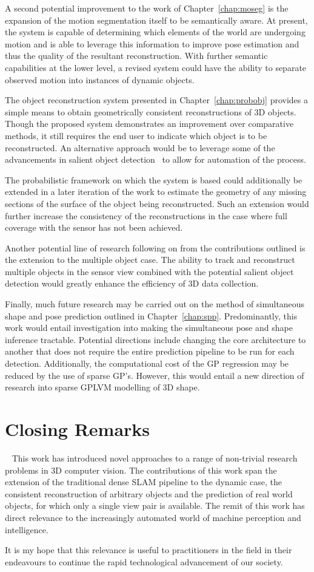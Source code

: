 A second potential improvement to the work of Chapter~\ref{chap:moseg} is the expansion of the 
motion segmentation itself to be semantically aware. At present, the system is capable of 
determining which elements of the world are undergoing motion and is able to leverage this 
information to improve pose estimation and thus the quality of the resultant reconstruction. 
With further semantic capabilities at the lower level, a revised system could have the ability 
to separate observed motion into instances of dynamic objects.

The object reconstruction system presented in Chapter~\ref{chap:probobj} provides a simple means 
to obtain geometrically consistent reconstructions of 3D objects. Though the proposed system
demonstrates an improvement over comparative methods, it still requires the end user to indicate 
which object is to be reconstructed. An alternative approach would be to leverage some of the 
advancements in salient object detection~\cite{Borji2014} to allow for automation of the process.

The probabilistic framework on which the system is based could additionally be extended in a later 
iteration of the work to estimate the geometry of any missing sections of the surface of the object 
being reconstructed. Such an extension would further increase the consistency of the reconstructions 
in the case where full coverage with the sensor has not been achieved.

Another potential line of research following on from the contributions outlined is the extension to 
the multiple object case. The ability to track and reconstruct multiple objects in the sensor view 
combined with the potential salient object detection would greatly enhance the efficiency of 3D data 
collection.

Finally, much future research may be carried out on the method of simultaneous shape and pose prediction 
outlined in Chapter~\ref{chap:spp}. Predominantly, this work would entail investigation into making the 
simultaneous pose and shape inference tractable. Potential directions include changing the core architecture 
to another that does not require the entire prediction pipeline to be run for each detection. Additionally, 
the computational cost of the GP regression may be reduced by the use of sparse GP's. However, this would 
entail a new direction of research into sparse GPLVM modelling of 3D shape.

\section{Closing Remarks}
~\label{sec:discussion_conclusions}
This work has introduced novel approaches to a range of non-trivial research problems in 3D computer 
vision. The contributions of this work span the extension of the traditional dense SLAM pipeline to 
the dynamic case, the consistent reconstruction of arbitrary objects and the prediction of real world 
objects, for which only a single view pair is available. The remit of this work has direct relevance to 
the increasingly automated world of machine perception and intelligence.

It is my hope that this relevance is useful to practitioners in the field in their endeavours 
to continue the rapid technological advancement of our society.